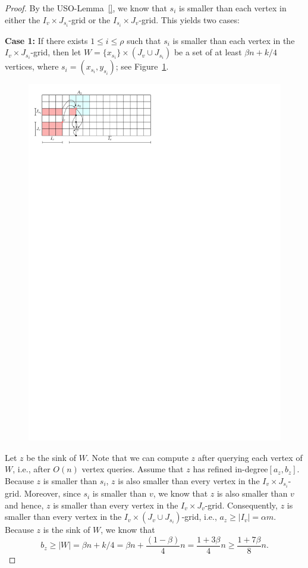 \documentclass[a4paper,10pt]{article}
\newcommand{\indegree}{refined in-degree\xspace}
\begin{document}
\begin{proof}
By the USO-Lemma~\ref{}, we know that $s_i$ is smaller than each vertex in either the $I_v\times J_{s_i}$-grid or the $I_{s_i}\times J_v$-grid. This yields two cases:

\textbf{Case 1:} If there exists $1\leq i \leq \rho$ such that
$s_i$ is smaller than each vertex in the $I_v\times J_{s_i}$-grid, then let $W =  \{x_{s_i}\} \times (J_v\cup J_{s_i})$ be a set of at least $\beta n + k/4$ vertices, where $s_i = (x_{s_i}, y_{s_i})$; see Figure~\ref{fig:Expansion Case 1}. 

\begin{figure}[h]
\centering
\includegraphics{expansion_lemma_Case1.pdf}
\caption{\small }
\label{fig:Expansion Case 1}
\end{figure}

Let $z$ be the sink of $W$. Note that we can compute $z$ after querying each vertex of $W$, i.e., after $O(n)$ vertex queries. Assume that $z$ has \indegree $[a_z, b_z]$. 
Because $z$ is smaller than $s_i$, $z$ is also smaller than every vertex in the $I_v\times J_{s_i}$-grid. Moreover, since $s_i$ is smaller than $v$, we know that $z$ is also smaller than $v$ and hence, $z$ is smaller than every vertex in the $I_v\times J_v$-grid.
Consequently, $z$ is smaller than every vertex in the $I_v\times (J_v\cup J_{s_i})$-grid, i.e., $a_z\geq |I_v| = \alpha m$.
Because $z$ is the sink of $W$, we know that
 $$b_z \geq |W| = \beta n + k/4 = \beta n + \frac{(1-\beta)}{4}n = \frac{1 + 3\beta}{4}n\geq \frac{1 + 7\beta}{8}n.$$



\end{proof}
\end{document}
